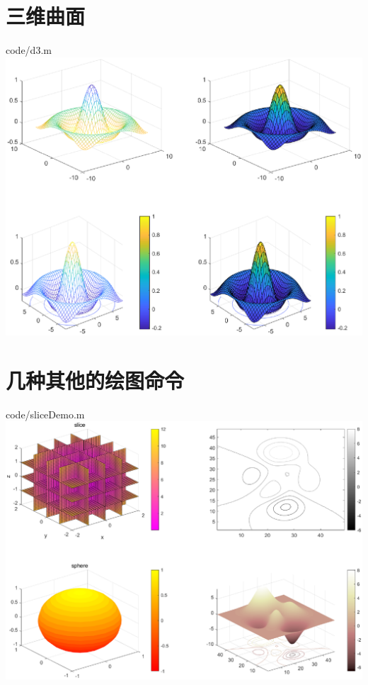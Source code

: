 \documentclass{hfutpaper}
\makeatletter
\newcommand{\figcaption}{\def\@captype{figure}\caption}
\makeatother
\begin{document}
\section*{三维曲面}

{code/d3.m}
\includegraphics[width=18cm]{figure/MS.eps}
\figcaption{三维曲面}

\section*{几种其他的绘图命令}

{code/sliceDemo.m}
\includegraphics[width=18cm]{figure/d33.eps}
\figcaption{(1)slice;(2)contour;(3)colorbar;(4)surfc}
\end{document}
